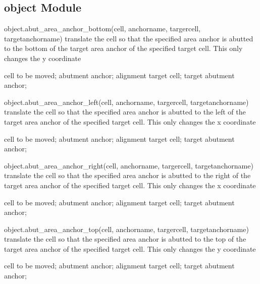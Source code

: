 \subsection{object Module}
\begin{APIfunc}{object.abut\_area\_anchor\_bottom(cell, anchorname, targercell, targetanchorname)}
    translate the cell so that the specified area anchor is abutted to the bottom of the target area anchor of the specified target cell. This only changes the y coordinate
    \begin{APIparameters}
            cell to be moved;
            abutment anchor;
            alignment target cell;
            target abutment anchor;
    \end{APIparameters}
\end{APIfunc}
\begin{APIfunc}{object.abut\_area\_anchor\_left(cell, anchorname, targercell, targetanchorname)}
    translate the cell so that the specified area anchor is abutted to the left of the target area anchor of the specified target cell. This only changes the x coordinate
    \begin{APIparameters}
            cell to be moved;
            abutment anchor;
            alignment target cell;
            target abutment anchor;
    \end{APIparameters}
\end{APIfunc}
\begin{APIfunc}{object.abut\_area\_anchor\_right(cell, anchorname, targercell, targetanchorname)}
    translate the cell so that the specified area anchor is abutted to the right of the target area anchor of the specified target cell. This only changes the x coordinate
    \begin{APIparameters}
            cell to be moved;
            abutment anchor;
            alignment target cell;
            target abutment anchor;
    \end{APIparameters}
\end{APIfunc}
\begin{APIfunc}{object.abut\_area\_anchor\_top(cell, anchorname, targercell, targetanchorname)}
    translate the cell so that the specified area anchor is abutted to the top of the target area anchor of the specified target cell. This only changes the y coordinate
    \begin{APIparameters}
            cell to be moved;
            abutment anchor;
            alignment target cell;
            target abutment anchor;
    \end{APIparameters}
\end{APIfunc}
